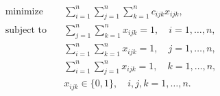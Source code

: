 \begin{align*}
\text{minimize} \quad & \sum_{i=1}^n \sum_{j=1}^n \sum_{k=1}^n c_{ijk} x_{ijk}, \\
\text{subject to} \quad & \sum_{j=1}^n \sum_{k=1}^n x_{ijk} = 1, \quad i = 1, \ldots, n,  \\
& \sum_{i=1}^n \sum_{k=1}^n x_{ijk} = 1, \quad j = 1, \ldots, n,  \\
& \sum_{i=1}^n \sum_{j=1}^n x_{ijk} = 1, \quad k = 1, \ldots, n,  \\
& x_{ijk} \in \lbrace 0, 1 \rbrace, \quad i,j,k = 1, \ldots,n.
\end{align*}
